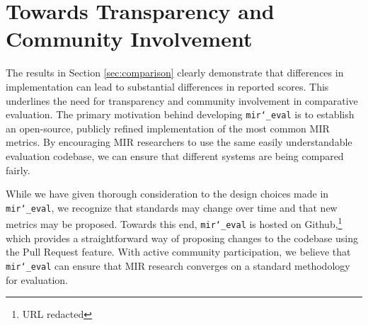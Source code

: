 \documentclass{article}
\def\mireval{\texttt{mir\char`_eval}}
\begin{document}
\section{Towards Transparency and Community Involvement}
\label{sec:discussion}

The results in Section \ref{sec:comparison} clearly demonstrate that differences in implementation can lead to substantial differences in reported scores.
This underlines the need for transparency and community involvement in comparative evaluation.
The primary motivation behind developing \mireval{} is to establish an open-source, publicly refined implementation of the most common MIR metrics.
By encouraging MIR researchers to use the same easily understandable evaluation codebase, we can ensure that different systems are being compared fairly.

While we have given thorough consideration to the design choices made in \mireval{}, we recognize that standards may change over time and that new metrics may be proposed.
Towards this end, \mireval{} is hosted on Github,\footnote{URL redacted} which provides a straightforward way of proposing changes to the codebase using the Pull Request feature.
With active community participation, we believe that \mireval{} can ensure that MIR research converges on a standard methodology for evaluation.


\end{document}
